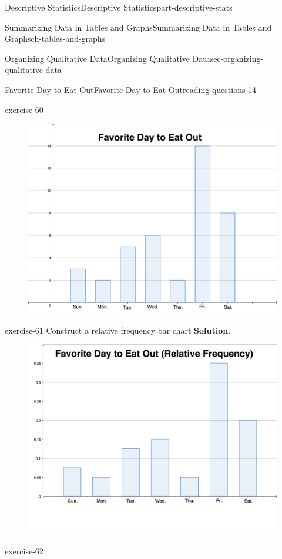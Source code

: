 \documentclass[oneside,10pt,]{book}
\numberwithin{equation}{section}
\begin{document}
\begin{partptx}{Descriptive Statistics}{}{Descriptive Statistics}{}{}{part-descriptive-stats}
\begin{chapterptx}{Summarizing Data in Tables and Graphs}{}{Summarizing Data in Tables and Graphs}{}{}{ch-tables-and-graphs}
\begin{sectionptx}{Organizing Qualitative Data}{}{Organizing Qualitative Data}{}{}{sec-organizing-qualitative-data}
\begin{reading-questions-subsection-numberless}{Favorite Day to Eat Out}{}{Favorite Day to Eat Out}{}{}{reading-questions-14}
\begin{divisionexercise}{3}{}{}{exercise-60}
\begin{figure}\centering\includegraphics[width=1\linewidth]{images/eat-out-bar-chart.png}
\end{figure}\end{divisionexercise}%
\begin{divisionexercise}{4}{}{}{exercise-61}%
\hypertarget{p-42}{}%
Construct a relative frequency bar chart%
\textbf{Solution}.\hypertarget{solution-6}{}\quad%
\begin{figure}\centering\includegraphics[width=1\linewidth]{images/eat-out-rel-freq-bar-chart.png}
\end{figure}\end{divisionexercise}%
\begin{divisionexercise}{5}{}{}{exercise-62}%

\end{divisionexercise}
\end{reading-questions-subsection-numberless}
\end{sectionptx}
\end{chapterptx}
\end{partptx}
\end{document}

